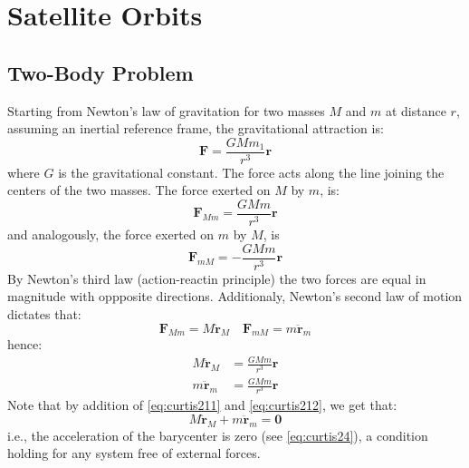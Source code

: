 \section{Satellite Orbits}
\label{sec:satellite-orbits}

\subsection{Two-Body Problem}
\label{ssec:keplerian-orbits}
Starting from Newton's law of gravitation for two masses $M$ and $m$ at 
distance $r$, assuming an inertial reference frame, the gravitational 
attraction is:
\begin{equation}
  \label{eq:chobotov31}
  \bm{F} = \frac{G M m_1}{r^3} \bm{r}
\end{equation}
where $G$ is the gravitational constant. The force acts along the line joining 
the centers of the two masses. The force exerted on $M$ by $m$, is:
\begin{equation}\label{eq:curtis29}
  \bm{F}_{Mm} = \frac{G M m}{r^3} \bm{r}
\end{equation}
and analogously, the force exerted on $m$ by $M$, is
\begin{equation}\label{eq:curtis210}
  \bm{F}_{mM} = -\frac{G M m}{r^3} \bm{r}
\end{equation}
By Newton's third law (action-reactin principle) the two forces are equal in 
magnitude with oppposite directions. Additionaly, Newton's second law of motion
dictates that:
\begin{equation}\label{eq:curtis2105}
  \bm{F}_{Mm} = M \ddot{\bm{r}}_M \quad \bm{F}_{mM} = m \ddot{\bm{r}}_m
\end{equation}
hence:
\begin{subequations}
  \begin{align}
    M \ddot{\bm{r}}_M &= \frac{G M m}{r^3} \bm{r} \label{eq:curtis211} \\
    m \ddot{\bm{r}}_m &= \frac{G M m}{r^3} \bm{r} \label{eq:curtis212}
  \end{align}
\end{subequations}
Note that by addition of \ref{eq:curtis211} and \ref{eq:curtis212}, we get that:
\begin{equation}
  M \ddot{\bm{r}}_M + m \ddot{\bm{r}}_m = \bm{0}
\end{equation}
i.e., the acceleration of the barycenter is zero (see \ref{eq:curtis24}), a 
condition holding for any system free of external forces.

